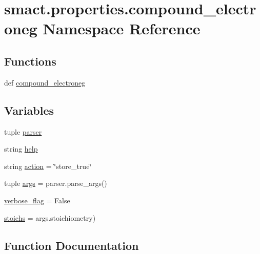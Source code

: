 \hypertarget{namespacesmact_1_1properties_1_1compound__electroneg}{}\section{smact.\+properties.\+compound\+\_\+electroneg Namespace Reference}
\label{namespacesmact_1_1properties_1_1compound__electroneg}
\subsection*{Functions}
\begin{DoxyCompactItemize}
\item 
def \hyperlink{namespacesmact_1_1properties_1_1compound__electroneg_a99c8a43bb8c9a63de9add0f25123225c}{compound\+\_\+electroneg}
\end{DoxyCompactItemize}
\subsection*{Variables}
\begin{DoxyCompactItemize}
\item 
tuple \hyperlink{namespacesmact_1_1properties_1_1compound__electroneg_a37c9645aeda095ca168aab4473ffaf08}{parser}
\item 
string \hyperlink{namespacesmact_1_1properties_1_1compound__electroneg_a61c7d3b4c24942457f1caa1322fad39a}{help}
\item 
string \hyperlink{namespacesmact_1_1properties_1_1compound__electroneg_aec2b007b9f27930ae06dcdd62b754ac1}{action} = \char`\"{}store\+\_\+true\char`\"{}
\item 
tuple \hyperlink{namespacesmact_1_1properties_1_1compound__electroneg_a5e28515ab4ddcfbd0b4434b8670b8b02}{args} = parser.\+parse\+\_\+args()
\item 
\hyperlink{namespacesmact_1_1properties_1_1compound__electroneg_a826aa7e85fedf31d7c07412fed4d3c35}{verbose\+\_\+flag} = False
\item 
\hyperlink{namespacesmact_1_1properties_1_1compound__electroneg_a9aba72c1028841fd2e02ce29beba3f95}{stoichs} = args.\+stoichiometry)
\end{DoxyCompactItemize}


\subsection{Function Documentation}
\hypertarget{namespacesmact_1_1properties_1_1compound__electroneg_a99c8a43bb8c9a63de9add0f25123225c}{}
